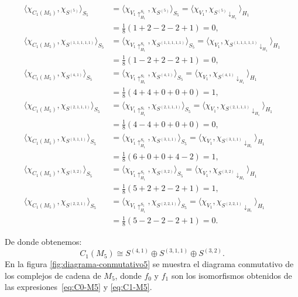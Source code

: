 \documentclass[12pt]{book}
\theoremstyle{definition}
\newcounter{in}
\begin{document}
  \begin{align*}
    \langle\chi_{C_{1}(M_{5})},\chi_{S^{(5)}}\rangle_{S_{5}}&=\langle\chi_{V_{1}\uparrow^{S_{5}}_{H_1}},\chi_{S^{(5)}}\rangle_{S_{5}}=\langle\chi_{V_{1}},\chi_{S^{(5)}\downarrow_{H_{1}}}\rangle_{H_{1}}\\
    &=\frac{1}{8}(1+2-2-2+1)=0,\\
    \langle\chi_{C_{1}(M_{5})},\chi_{S^{(1,1,1,1,1)}}\rangle_{S_{5}}&=\langle\chi_{V_{1}\uparrow^{S_{5}}_{H_1}},\chi_{S^{(1,1,1,1,1)}}\rangle_{S_{5}}=\langle\chi_{V_{1}},\chi_{S^{(1,1,1,1,1)}\downarrow_{H_{1}}}\rangle_{H_{1}}\\
    &=\frac{1}{8}(1-2+2-2+1)=0, \\
    \langle\chi_{C_{1}(M_{5})},\chi_{S^{(4,1)}}\rangle_{S_{5}}&=\langle\chi_{V_{1}\uparrow^{S_{5}}_{H_1}},\chi_{S^{(4,1)}}\rangle_{S_{5}}=\langle\chi_{V_{1}},\chi_{S^{(4,1)}\downarrow_{H_{1}}}\rangle_{H_{1}}\\
    &=\frac{1}{8}(4+4+0+0+0)=1, \\
    \langle\chi_{C_{1}(M_{5})},\chi_{S^{(2,1,1,1)}}\rangle_{S_{5}}&=\langle\chi_{V_{1}\uparrow^{S_{5}}_{H_1}},\chi_{S^{(2,1,1,1)}}\rangle_{S_{5}}=\langle\chi_{V_{1}},\chi_{S^{(2,1,1,1)}\downarrow_{H_{1}}}\rangle_{H_{1}}\\
    &=\frac{1}{8}(4-4+0+0+0)=0, \\
    \langle\chi_{C_{1}(M_{5})},\chi_{S^{(3,1,1)}}\rangle_{S_{5}}&=\langle\chi_{V_{1}\uparrow^{S_{5}}_{H_1}},\chi_{S^{(3,1,1)}}\rangle_{S_{5}}=\langle\chi_{V_{1}},\chi_{S^{(3,1,1)}\downarrow_{H_{1}}}\rangle_{H_{1}}\\
    &=\frac{1}{8}(6+0+0+4-2)=1, \\
    \langle\chi_{C_{1}(M_{5})},\chi_{S^{(3,2)}}\rangle_{S_{5}}&=\langle\chi_{V_{1}\uparrow^{S_{5}}_{H_1}},\chi_{S^{(3,2)}}\rangle_{S_{5}}=\langle\chi_{V_{1}},\chi_{S^{(3,2)}\downarrow_{H_{1}}}\rangle_{H_{1}}\\
    &=\frac{1}{8}(5+2+2-2+1)=1, \\
    \langle\chi_{C_{1}(M_{5})},\chi_{S^{(2,2,1)}}\rangle_{S_{5}}&=\langle\chi_{V_{1}\uparrow^{S_{5}}_{H_1}},\chi_{S^{(2,2,1)}}\rangle_{S_{5}}=\langle\chi_{V_{1}},\chi_{S^{(2,2,1)}\downarrow_{H_{1}}}\rangle_{H_{1}}\\
    &=\frac{1}{8}(5-2-2-2+1)=0.
  \end{align*}

De donde obtenemos:
\begin{equation}
  \label{eq:C1-M5}
  C_{1}(M_{5})\cong S^{(4,1)}\oplus S^{(3,1,1)}\oplus S^{(3,2)}.
\end{equation}
En la figura \ref{fig:diagrama-conmutativo5} se muestra el diagrama
conmutativo de los complejos de cadena de $M_{5}$, donde $f_{0}$ y
$f_{1}$ son los isomorfismos obtenidos de las expresiones~\ref{eq:C0-M5} y \ref{eq:C1-M5}.
\end{document}
